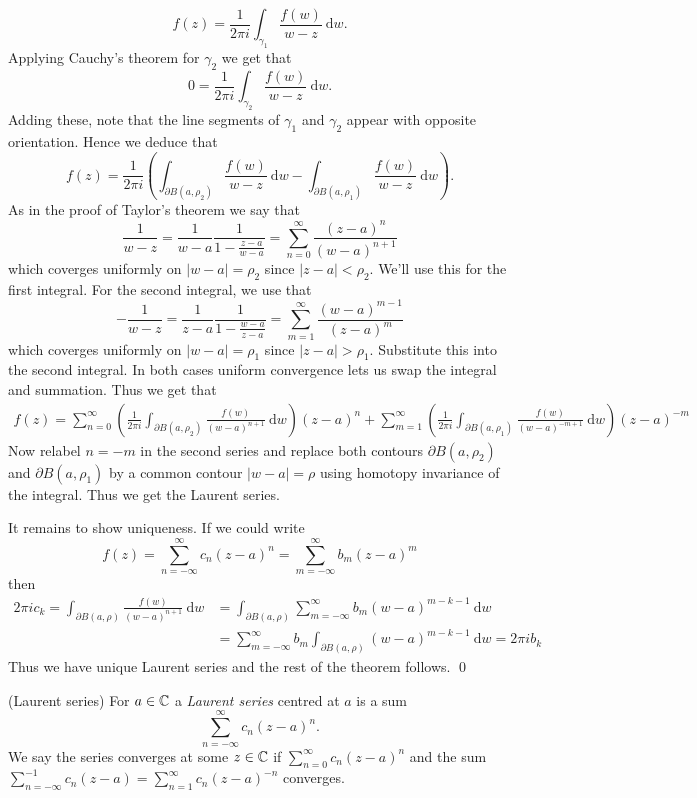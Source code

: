 \documentclass{article}
\begin{document}
\[
	f(z) = \frac 1{2\pi i} \int_{\gamma_1} \frac{f(w)}{w-z}\ \mathrm dw.
\]
Applying Cauchy's theorem for $ \gamma_2 $ we get that
\[
	0 =\frac 1{2\pi i}\int_{\gamma_2} \frac{f(w)}{w-z}\ \mathrm dw.
\]
Adding these, note that the line segments of $ \gamma_1 $ and $ \gamma_2 $ appear with opposite orientation. Hence we deduce that
\[
	f(z) = \frac 1{2\pi i}\left(\int_{\partial B(a,\rho_2)} \frac{f(w)}{w-z}\ \mathrm dw - \int_{\partial B(a,\rho_1)} \frac{f(w)}{w-z}\ \mathrm dw\right).
\]
As in the proof of Taylor's theorem we say that
\[
	\frac 1{w-z} = \frac{1}{w-a}\frac1{1-\frac{z-a}{w-a}} = \sum_{n=0}^\infty \frac{(z-a)^n}{(w-a)^{n+1}}
\]
which coverges uniformly on $ |w-a|=\rho_2 $ since $ |z-a|<\rho_2 $. We'll use this for the first integral. For the second integral, we use that
\[
	-\frac1{w-z} =  \frac1{z-a}\frac1{1-\frac{w-a}{z-a}}= \sum_{m=1}^\infty \frac{(w-a)^{m-1}}{(z-a)^m}
\]
which coverges uniformly on $ |w-a| = \rho_1 $ since $ |z-a|>\rho_1 $. Substitute this into the second integral. In both cases uniform convergence lets us swap the integral and summation. Thus we get that
\begin{align*}
	f(z) = \sum_{n=0}^\infty \left(\frac 1{2\pi i} \int_{\partial B(a,\rho_2)}\frac{f(w)}{(w-a)^{n+1}}\ \mathrm dw\right)(z-a)^n + \sum_{m=1}^\infty\left(\frac 1{2\pi i} \int_{\partial B(a,\rho_1)} \frac{f(w)}{(w-a)^{-m+1}} \ \mathrm dw\right)(z-a)^{-m}
\end{align*}
Now relabel $ n=-m $ in the second series and replace both contours $ \partial B(a,\rho_2) $ and $ \partial B(a,\rho_1) $ by a common contour $ |w-a| = \rho $ using homotopy invariance of the integral. Thus we get the Laurent series.\par
It remains to show uniqueness. If we could write
\[
	f(z) = \sum_{n=-\infty}^{\infty} c_n(z-a)^n = \sum_{m=-\infty}^\infty b_m(z-a)^m
\]
then
\begin{align*}
	2\pi i c_k = \int_{\partial B(a,\rho)} \frac{f(w)}{(w-a)^{n+1}}\ \mathrm dw &= \int_{\partial B(a,\rho)} \sum_{m=-\infty}^\infty b_m (w-a)^{m-k-1}\ \mathrm dw \\
										    &= \sum_{m=-\infty}^\infty b_m \int_{\partial B(a,\rho)}(w-a)^{m-k-1} \ \mathrm dw = 2\pi i b_k
\end{align*}
Thus we have unique Laurent series and the rest of the theorem follows. \qed
\begin{definition}
	(Laurent series) For $ a\in \mathbb{C} $ a \textit{Laurent series} centred at $ a $ is a sum
	\[
		\sum_{n=-\infty}^\infty c_n(z-a)^n.
	\]
	We say the series converges at some $ z\in \mathbb{C} $ if $ \sum_{n=0}^\infty c_n(z-a)^n $ and the sum $ \sum_{n=-\infty}^{-1} c_n(z-a) = \sum_{n=1}^\infty c_n(z-a)^{-n} $ converges.
\end{definition}
\end{document}
